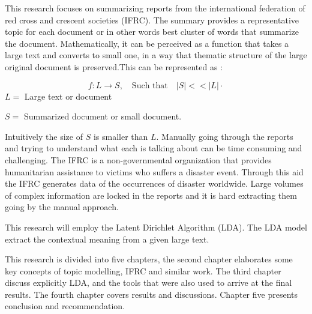 This research focuses on summarizing reports from the international federation of red cross and crescent societies (IFRC).
The summary provides  a  representative topic for each document or in other words best cluster of words that summarize the document. Mathematically, it can be perceived as a function that takes a large text and converts to small one, in a way that thematic structure of the large original document is preserved.This can be represented as :

$$f:L \longrightarrow S, \quad \text{Such that} \quad |S|<< |L| \cdot$$
$L=$ Large text or document

$S=$ Summarized document or small document.
  
Intuitively the size of $S$ is smaller than $L$.
Manually going through the reports and trying to understand what each is talking about can be time consuming and challenging. The IFRC is a non-governmental organization
that provides humanitarian assistance to victims who suffers
a disaster event. Through this aid the 	IFRC generates data of the occurrences of disaster
worldwide. Large volumes of complex information    are locked in the reports and it is hard extracting
them going by the manual approach. 

This research will employ the Latent Dirichlet Algorithm (LDA).
 The LDA model extract the contextual meaning from a given large text. 

 This research is divided into five chapters, the second chapter elaborates some key concepts of topic modelling, IFRC and similar work. The third chapter discuss
 explicitly LDA,  and the tools that were also used to arrive at the final results. The fourth chapter covers results and discussions. Chapter five presents conclusion and recommendation.
 

